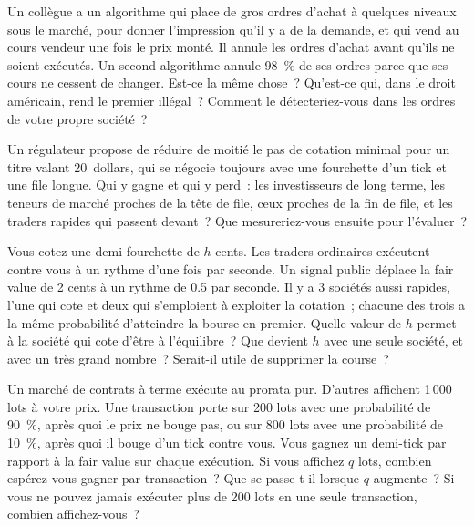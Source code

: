 \begin{question}\label{iq:iv2:markets-and-microstructure:40}
Un collègue a un algorithme qui place de gros ordres d'achat à quelques niveaux sous le marché, pour donner l'impression qu'il y a de la demande, et qui vend au cours vendeur une fois le prix monté. Il annule les ordres d'achat avant qu'ils ne soient exécutés. Un second algorithme annule 98~\% de ses ordres parce que ses cours ne cessent de changer. Est-ce la même chose~? Qu'est-ce qui, dans le droit américain, rend le premier illégal~? Comment le détecteriez-vous dans les ordres de votre propre société~?
\end{question}

\begin{question}\label{iq:iv2:markets-and-microstructure:41}
Un régulateur propose de réduire de moitié le pas de cotation minimal pour un titre valant 20~dollars, qui se négocie toujours avec une fourchette d'un tick et une file longue. Qui y gagne et qui y perd~: les investisseurs de long terme, les teneurs de marché proches de la tête de file, ceux proches de la fin de file, et les traders rapides qui passent devant~? Que mesureriez-vous ensuite pour l'évaluer~?
\end{question}

\begin{question}\label{iq:iv2:markets-and-microstructure:42}
Vous cotez une demi-fourchette de $h$ cents. Les traders ordinaires exécutent contre vous à un rythme d'une fois par seconde. Un signal public déplace la fair value de 2 cents à un rythme de 0.5 par seconde. Il y a 3 sociétés aussi rapides, l'une qui cote et deux qui s'emploient à exploiter la cotation~; chacune des trois a la même probabilité d'atteindre la bourse en premier. Quelle valeur de $h$ permet à la société qui cote d'être à l'équilibre~? Que devient $h$ avec une seule société, et avec un très grand nombre~? Serait-il utile de supprimer la course~?
\end{question}

\begin{question}\label{iq:iv2:markets-and-microstructure:43}
Un marché de contrats à terme exécute au prorata pur. D'autres affichent 1\,000 lots à votre prix. Une transaction porte sur 200 lots avec une probabilité de 90~\%, après quoi le prix ne bouge pas, ou sur 800 lots avec une probabilité de 10~\%, après quoi il bouge d'un tick contre vous. Vous gagnez un demi-tick par rapport à la fair value sur chaque exécution. Si vous affichez $q$ lots, combien espérez-vous gagner par transaction~? Que se passe-t-il lorsque $q$ augmente~? Si vous ne pouvez jamais exécuter plus de 200 lots en une seule transaction, combien affichez-vous~?
\end{question}

